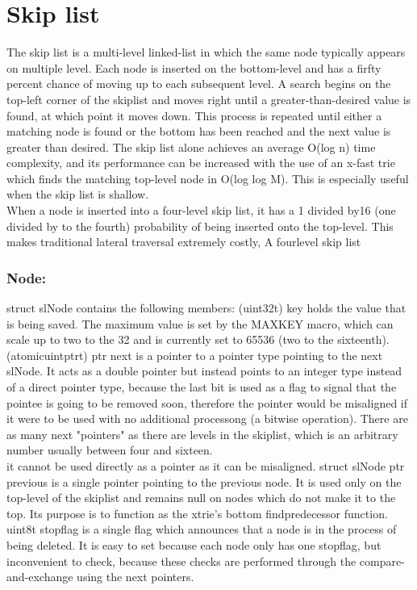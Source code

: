 \documentclass[10pt,twocolumn]{article}
\begin{document}
\section{Skip list}
The skip list is a multi-level linked-list in which the same node typically appears on multiple level. Each node is inserted on the bottom-level and has a firfty percent chance of moving up to each subsequent level. A search begins on the top-left corner of the skiplist and moves right until a greater-than-desired value is found, at which point it moves down. This process is repeated until either a matching node is found or the bottom has been reached and the next value is greater than desired. The skip list alone achieves an average O(log n) time complexity, and its performance can be increased with the use of an x-fast trie which finds the matching top-level node in O(log log M). This is especially useful when the skip list is shallow. \\

When a node is inserted into a four-level skip list, it has a 1 divided by16 (one divided by to the fourth) probability of being inserted onto the top-level. This makes traditional lateral traversal extremely costly, 
A fourlevel skip list \\


\subsubsection{Node:}
struct slNode contains the following members:
(uint32t) key holds the value that is being saved. The maximum value is set by the MAXKEY macro, which can scale up to two to the 32 and is currently set to 65536 (two to the sixteenth).\\
(atomicuintptrt) ptr next is a pointer to a pointer type pointing to the next slNode. It acts as a double pointer but instead points to an integer type instead of a direct pointer type, because the last bit is used as a flag to signal that the pointee is going to be removed soon, therefore the pointer would be misaligned if it were to be used with no additional processong (a bitwise operation). There are as many next "pointers" as there are levels in the skiplist, which is an arbitrary number usually between four and sixteen.\\
it cannot be used directly as a pointer as it can be misaligned.
struct slNode ptr previous is a single pointer pointing to the previous node. It is used only on the top-level of the skiplist and remains null on nodes which do not make it to the top. Its purpose is to function as the xtrie's bottom findpredecessor function.\\
uint8t stopflag is a single flag which announces that a node is in the process of being deleted. It is easy to set because each node only has one stopflag, but inconvenient to check, because these checks are performed through the compare-and-exchange using the next pointers.
	
\end{document}
